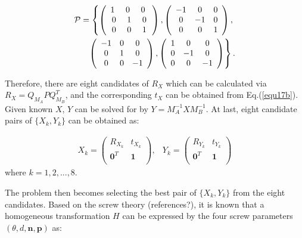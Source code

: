 \documentclass[letterpaper, 10 pt, conference]{ieeeconf}  %
\begin{document}
\begin{equation}\label{equ19}
\begin{split}
{\cal P} = \left\{ \left(\begin{array}{ccc}
1\,\, & 0 \,\, & 0 \,\, \\
0 & 1 & 0\\
0 & 0 & 1 \end{array}\right) , \left(\begin{array}{ccc}
-1 & 0 & 0 \\
0 & -1 & 0\\
0 & 0 & 1 \end{array}\right), \right.\\
\left. \left(\begin{array}{ccc}
-1 & 0 & 0 \\
0 & 1 & 0\\
0 & 0 & -1 \end{array}\right), \left(\begin{array}{ccc}
1 & 0 & 0 \\
0 & -1 & 0\\
0 & 0 & -1 \end{array}\right)\right\}.
\end{split}
\end{equation}

Therefore, there are eight candidates of $R_{X}$ which can be calculated via $R_{X}=Q_{M_{A}}PQ_{M_{B}}^T$, and the corresponding $t_{X}$ can be obtained  from Eq.(\ref{equ17b}). Given known $X$, $Y$ can be solved for by $Y = M_A^{-1}XM_B^{-1}$. At last, eight candidate pairs of  $\{X_{k},Y_{k}\}$ can be obtained as:

\begin{equation}\label{equ20}
\begin{array}{cc}
X_{k}= \left( \begin{array}{cc}
       R_{X_k} & t_{X_k} \\
       \mathbf{0}^{T} & \mathbf{1}\\
\end{array} \right),&
Y_{k}= \left( \begin{array}{cc}
       R_{Y_k} & t_{Y_k} \\
       \mathbf{0}^{T} & \mathbf{1}\\
\end{array} \right)
\end{array}
\end{equation}
where $k = 1,2,...,8$.

The problem then becomes selecting the best pair of $\{X_k, Y_k\}$ from the eight candidates.
Based on the screw theory (references?), it is known that a homogeneous transformation $H$ can be expressed by the four screw parameters $(\theta,d,\mathbf{n},\mathbf{p})$ as:
\end{document}
